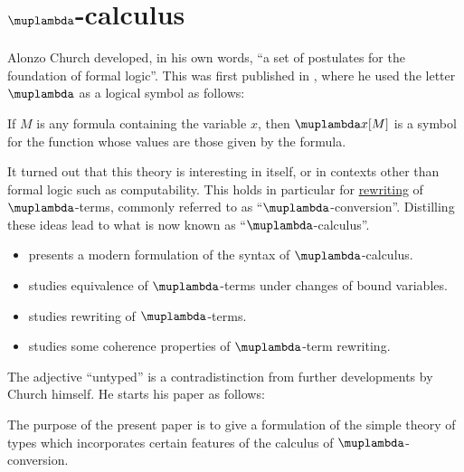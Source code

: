 \chapter{\texorpdfstring{\( \muplambda \)}{λ}-calculus}\label{ch:lambda_calculus}

Alonzo Church developed, in his own words, \enquote{a set of postulates for the foundation of formal logic}. This was first published in \cite{Church1932LambdaCalculus}, where he used the letter \( \muplambda \) as a logical symbol as follows:
\begin{displayquote}
  If \( M \) is any formula containing the variable \( x \), then \( \muplambda x [M] \) is a symbol for the function whose values are those given by the formula.
\end{displayquote}

It turned out that this theory is interesting in itself, or in contexts other than formal logic such as computability. This holds in particular for \hyperref[def:rewriting_system]{rewriting} of \( \muplambda \)-terms, commonly referred to as \enquote{\( \muplambda \)-conversion}. Distilling these ideas lead to what is now known as \enquote{\( \muplambda \)-calculus}.

\begin{itemize}
  \item {} presents a modern formulation of the syntax of \( \muplambda \)-calculus.
  \item {} studies equivalence of \( \muplambda \)-terms under changes of bound variables.
  \item {} studies rewriting of \( \muplambda \)-terms.
  \item {} studies some coherence properties of \( \muplambda \)-term rewriting.
\end{itemize}

The adjective \enquote{untyped} is a contradistinction from further developments by Church himself. He starts his paper \cite{Church1940STT} as follows:
\begin{displayquote}
  The purpose of the present paper is to give a formulation of the simple theory of types which incorporates certain features of the calculus of \( \muplambda \)-conversion.
\end{displayquote}

